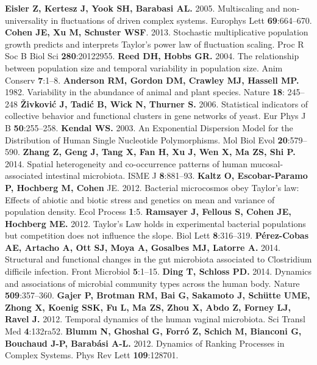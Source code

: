 \documentclass[12pt,oneside,letterpaper]{article}
\begin{document}
\begin{thebibliography}{99}
 {\bf Eisler Z, Kertesz J, Yook SH, Barabasi AL.} 2005. Multiscaling and non-universality in fluctuations of driven complex systems. Europhys Lett {\bf 69}:664–670.
 {\bf Cohen JE, Xu M, Schuster WSF}. 2013. Stochastic multiplicative population growth predicts and interprets Taylor’s power law of fluctuation scaling. Proc R Soc B Biol Sci {\bf 280}:20122955.
 {\bf Reed DH, Hobbs GR.} 2004. The relationship between population size and temporal variability in population size. Anim Conserv {\bf 7}:1–8.
 {\bf Anderson RM, Gordon DM, Crawley MJ, Hassell MP.} 1982. Variability in the abundance of animal and plant species. Nature {\bf 18}: 245–248
 {\bf Živković J, Tadić B, Wick N, Thurner S.} 2006. Statistical indicators of collective behavior and functional clusters in gene networks of yeast. Eur Phys J B {\bf 50}:255–258.
 {\bf Kendal WS.} 2003. An Exponential Dispersion Model for the Distribution of Human Single Nucleotide Polymorphisms. Mol Biol Evol {\bf 20}:579–590.
 {\bf Zhang Z, Geng J, Tang X, Fan H, Xu J, Wen X, Ma ZS, Shi P.} 2014. Spatial heterogeneity and co-occurrence patterns of human mucosal-associated intestinal microbiota. ISME J {\bf 8}:881–93.
 {\bf Kaltz O, Escobar-Paramo P, Hochberg M, Cohen} JE. 2012. Bacterial microcosmos obey Taylor’s law: Effects of abiotic and biotic stress and genetics on mean and variance of population density. Ecol Process {\bf 1}:5.
 {\bf Ramsayer J, Fellous S, Cohen JE, Hochberg ME.} 2012. Taylor’s Law holds in experimental bacterial populations but competition does not influence the slope. Biol Lett {\bf 8}:316–319.
 {\bf Pérez-Cobas AE, Artacho A, Ott SJ, Moya A, Gosalbes MJ, Latorre A.} 2014. Structural and functional changes in the gut microbiota associated to Clostridium difficile infection. Front Microbiol {\bf 5}:1–15.
 {\bf Ding T, Schloss PD.} 2014. Dynamics and associations of microbial community types across the human body. Nature {\bf 509}:357–360.
 {\bf Gajer P, Brotman RM, Bai G, Sakamoto J, Schütte UME, Zhong X, Koenig SSK, Fu L, Ma ZS, Zhou X, Abdo Z, Forney LJ, Ravel J.} 2012. Temporal dynamics of the human vaginal microbiota. Sci Transl Med {\bf 4}:132ra52.
 {\bf Blumm N, Ghoshal G, Forró Z, Schich M, Bianconi G, Bouchaud J-P, Barabási A-L.} 2012. Dynamics of Ranking Processes in Complex Systems. Phys Rev Lett {\bf 109}:128701.


\end{thebibliography}
\end{document}
